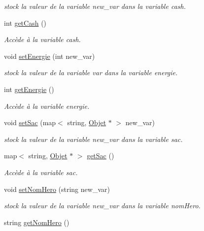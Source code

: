 \begin{DoxyCompactItemize}
\begin{DoxyCompactList}\small\item\em stock la valeur de la variable new\-\_\-var dans la variable cash. \end{DoxyCompactList}\item 
int \hyperlink{class_heros_a77bdee21cb8c8356448bb6669941441c}{get\-Cash} ()
\begin{DoxyCompactList}\small\item\em Accède à la variable cash. \end{DoxyCompactList}\item 
void \hyperlink{class_heros_a5d4f5d3d3a4db451923f0609a3e1b53c}{set\-Energie} (int new\-\_\-var)
\begin{DoxyCompactList}\small\item\em stock la valeur de la variable var dans la variable energie. \end{DoxyCompactList}\item 
int \hyperlink{class_heros_ae9bbef6d2edcb8b14d9ec3854146a42c}{get\-Energie} ()
\begin{DoxyCompactList}\small\item\em Accède à la variable energie. \end{DoxyCompactList}\item 
void \hyperlink{class_heros_a7d6d86388fe81deca1c5688ed07b2167}{set\-Sac} (map$<$ string, \hyperlink{class_objet}{Objet} $\ast$ $>$ new\-\_\-var)
\begin{DoxyCompactList}\small\item\em stock la valeur de la variable new\-\_\-var dans la variable sac. \end{DoxyCompactList}\item 
map$<$ string, \hyperlink{class_objet}{Objet} $\ast$ $>$ \hyperlink{class_heros_a62d8b172e82dbb0a1d2c23da21bdb069}{get\-Sac} ()
\begin{DoxyCompactList}\small\item\em Accède à la variable sac. \end{DoxyCompactList}\item 
void \hyperlink{class_heros_a74280cbf77bf35ee84728c989f6400c6}{set\-Nom\-Hero} (string new\-\_\-var)
\begin{DoxyCompactList}\small\item\em stock la valeur de la variable new\-\_\-var dans la variable nom\-Hero. \end{DoxyCompactList}\item 
string \hyperlink{class_heros_a1f950fc56d8c9813c4a7b76dae465478}{get\-Nom\-Hero} ()

\end{DoxyCompactItemize}
